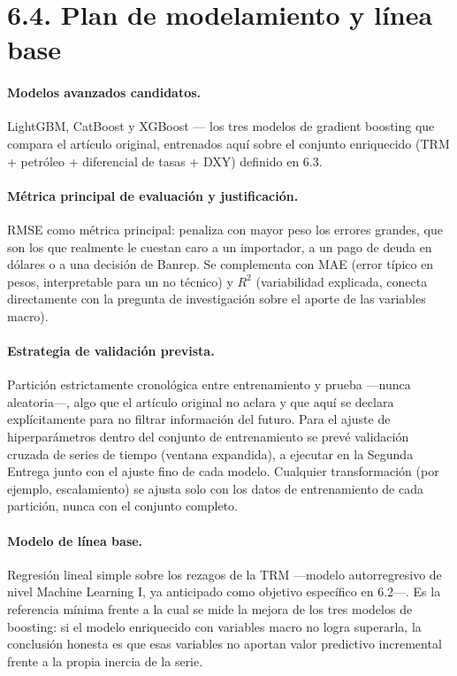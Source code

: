 \documentclass[11pt,letterpaper]{article}
\begin{document}
  \section*{6.4. Plan de modelamiento y línea base}

  \paragraph{Modelos avanzados candidatos.} LightGBM, CatBoost y XGBoost --- los tres modelos de gradient boosting que compara el artículo original, entrenados aquí sobre el conjunto enriquecido (TRM + petróleo + diferencial de tasas + DXY) definido en 6.3.

  \paragraph{Métrica principal de evaluación y justificación.} RMSE como métrica principal: penaliza con mayor peso los errores grandes, que son los que realmente le cuestan caro a un importador, a un pago de deuda en dólares o a una decisión de Banrep. Se complementa con MAE (error típico en pesos, interpretable para un no técnico) y $R^2$ (variabilidad explicada, conecta directamente con la pregunta de investigación sobre el aporte de las variables macro).

  \paragraph{Estrategia de validación prevista.} Partición estrictamente cronológica entre entrenamiento y prueba ---nunca aleatoria---, algo que el artículo original no aclara y que aquí se declara explícitamente para no filtrar información del futuro. Para el ajuste de hiperparámetros dentro del conjunto de entrenamiento se prevé validación cruzada de series de tiempo (ventana expandida), a ejecutar en la Segunda Entrega junto con el ajuste fino de cada modelo. Cualquier transformación (por ejemplo, escalamiento) se ajusta solo con los datos de entrenamiento de cada partición, nunca con el conjunto completo.

  \paragraph{Modelo de línea base.} Regresión lineal simple sobre los rezagos de la TRM ---modelo autorregresivo de nivel Machine Learning I, ya anticipado como objetivo específico en 6.2---. Es la referencia mínima frente a la cual se mide la mejora de los tres modelos de boosting: si el modelo enriquecido con variables macro no logra superarla, la conclusión honesta es que esas variables no aportan valor predictivo incremental frente a la propia inercia de la serie.
\end{document}
